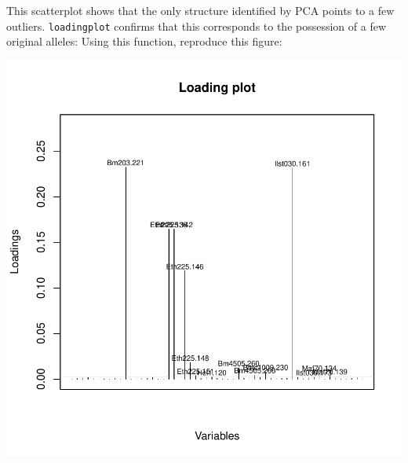 \documentclass{article}
\begin{document}
\noindent This scatterplot shows that the only structure identified by PCA points to a few outliers.
\texttt{loadingplot} confirms that this corresponds to the possession of a few original alleles:
Using this function, reproduce this figure:
\begin{Schunk}
\end{Schunk}
\includegraphics{figs/spca-035}
\end{document}
